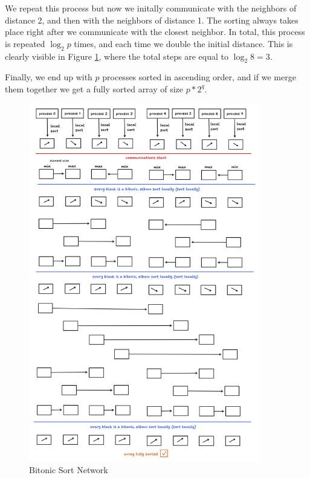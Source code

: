 \documentclass{article}
\begin{document}
We repeat this process but now we initally communicate with the neighbors of distance 2, and then with 
the neighbors of distance 1. The sorting always takes place right after we communicate with the closest neighbor.
In total, this process is repeated $\log_2{p}$ times, and each time we double the initial distance. 
This is clearly visible in Figure \ref{fig:bitonic-sort-network}, where the total steps are equal to $\log_2{8} = 3$.

Finally, we end up with $p$ processes sorted in ascending order, and if we merge them together we get a fully
sorted array of size $p * 2^q$.




\begin{figure}[H]
    \centering
    \includegraphics[width=0.9\textwidth]{bitonic-sort-network.png}
    \caption{Bitonic Sort Network}
    \label{fig:bitonic-sort-network}
\end{figure}
\end{document}
